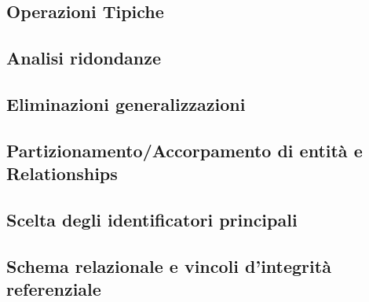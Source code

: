 \subsection{Operazioni Tipiche}


\subsection{Analisi ridondanze}
	
	
\subsection{Eliminazioni generalizzazioni}


\subsection{Partizionamento/Accorpamento di entità e Relationships}


\subsection{Scelta degli identificatori principali}


\subsection{Schema relazionale e vincoli d'integrità referenziale}


